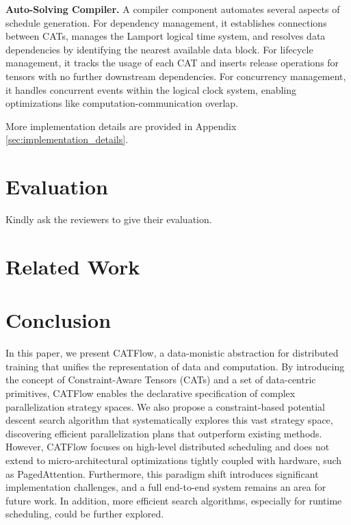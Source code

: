 \documentclass[letterpaper,twocolumn,10pt]{article}
\newcommand{\name}{CATFlow}
\begin{document}
\textbf{Auto-Solving Compiler.} A compiler component automates several aspects of schedule generation. For dependency management, it establishes connections between CATs, manages the Lamport logical time system, and resolves data dependencies by identifying the nearest available data block. For lifecycle management, it tracks the usage of each CAT and inserts release operations for tensors with no further downstream dependencies. For concurrency management, it handles concurrent events within the logical clock system, enabling optimizations like computation-communication overlap.

More implementation details are provided in Appendix \ref{sec:implementation_details}.

\section{Evaluation}
\label{sec:exp}

Kindly ask the reviewers to give their evaluation.

\section{Related Work}

\section{Conclusion}

In this paper, we present \name{}, a data-monistic abstraction for distributed training that unifies the representation of data and computation. By introducing the concept of Constraint-Aware Tensors (CATs) and a set of data-centric primitives, \name{} enables the declarative specification of complex parallelization strategy spaces. We also propose a constraint-based potential descent search algorithm that systematically explores this vast strategy space, discovering efficient parallelization plans that outperform existing methods. However, \name{} focuses on high-level distributed scheduling and does not extend to micro-architectural optimizations tightly coupled with hardware, such as PagedAttention. Furthermore, this paradigm shift introduces significant implementation challenges, and a full end-to-end system remains an area for future work. In addition, more efficient search algorithms, especially for runtime scheduling, could be further explored.




\end{document}
